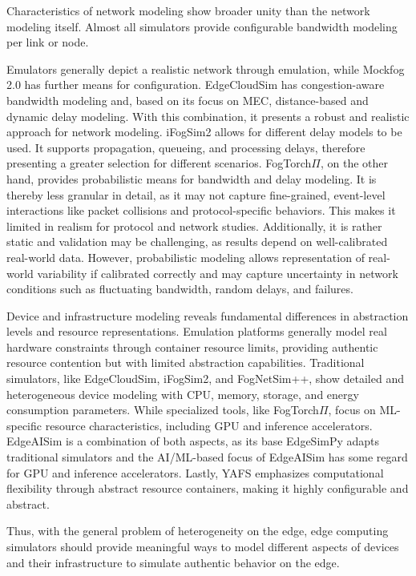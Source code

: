 Characteristics of network modeling show broader unity than the network modeling itself.
Almost all simulators provide configurable bandwidth modeling per link or node.

Emulators generally depict a realistic network through emulation, while Mockfog 2.0 has further means for configuration.
EdgeCloudSim has congestion-aware bandwidth modeling and, based on its focus on MEC, distance-based and dynamic delay modeling.
With this combination, it presents a robust and realistic approach for network modeling.
iFogSim2 allows for different delay models to be used. 
It supports propagation, queueing, and processing delays, therefore presenting a greater selection for different scenarios.
FogTorch$\Pi$, on the other hand, provides probabilistic means for bandwidth and delay modeling.
It is thereby less granular in detail, as it may not capture fine-grained, event-level interactions like packet collisions and protocol-specific behaviors.
This makes it limited in realism for protocol and network studies.
Additionally, it is rather static and validation may be challenging, as results depend on well-calibrated real-world data.
However, probabilistic modeling allows representation of real-world variability if calibrated correctly and may capture uncertainty in network conditions such as fluctuating bandwidth, random delays, and failures.

Device and infrastructure modeling reveals fundamental differences in abstraction levels and resource representations.
Emulation platforms generally model real hardware constraints through container resource limits, providing authentic resource contention but with limited abstraction capabilities.
Traditional simulators, like EdgeCloudSim, iFogSim2, and FogNetSim++, show detailed and heterogeneous device modeling with CPU, memory, storage, and energy consumption parameters.
While specialized tools, like FogTorch$\Pi$, focus on ML-specific resource characteristics, including GPU and inference accelerators.
EdgeAISim is a combination of both aspects, as its base EdgeSimPy adapts traditional simulators and the AI/ML-based focus of EdgeAISim has some regard for GPU and inference accelerators.
Lastly, YAFS emphasizes computational flexibility through abstract resource containers, making it highly configurable and abstract.

Thus, with the general problem of heterogeneity on the edge, edge computing simulators should provide meaningful ways to model different aspects of devices and their infrastructure to simulate authentic behavior on the edge.

